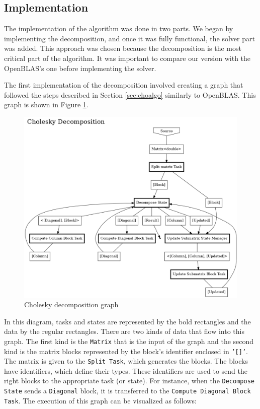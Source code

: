 \subsection{Implementation}

The implementation of the algorithm was done in two parts. We began by
implementing the decomposition, and once it was fully functional, the solver
part was added. This approach was chosen because the decomposition is the most
critical part of the algorithm. It was important to compare our version with the
OpenBLAS's one before implementing the solver.

The first implementation of the decomposition involved creating a graph that
followed the steps described in Section \ref{sec:choalgo} similarly to
OpenBLAS. This graph is shown in Figure \ref{fig:chograph}.

\begin{figure}[!ht]
  \begin{center}
    \includegraphics[scale=0.3]{img/cho-img/decompose_graph.png}
    \caption{Cholesky decomposition graph}
    \label{fig:chograph}
  \end{center}
\end{figure}

In this diagram, tasks and states are represented by the bold rectangles and the
data by the regular rectangles. There are two kinds of data that flow into this
graph. The first kind is the \texttt{Matrix} that is the input of the graph and
the second kind is the matrix blocks represented by the block's identifier
enclosed in \texttt{'[]'}. The matrix is given to the \texttt{Split Task}, which
generates the blocks. The blocks have identifiers, which define their types.
These identifiers are used to send the right blocks to the appropriate task (or
state). For instance, when the \texttt{Decompose State} sends a
\texttt{Diagonal} block, it is transferred to the \texttt{Compute Diagonal Block
Task}. The execution of this graph can be visualized as follows:


